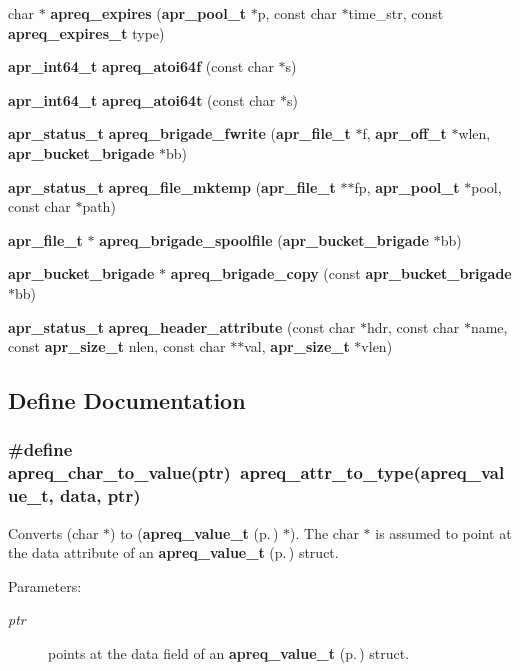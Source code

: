 \begin{CompactItemize}
\item 
char $\ast$ {\bf apreq\_\-expires} ({\bf apr\_\-pool\_\-t} $\ast$p, const char $\ast$time\_\-str, const {\bf apreq\_\-expires\_\-t} type)
\item 
{\bf apr\_\-int64\_\-t} {\bf apreq\_\-atoi64f} (const char $\ast$s)
\item 
{\bf apr\_\-int64\_\-t} {\bf apreq\_\-atoi64t} (const char $\ast$s)
\item 
{\bf apr\_\-status\_\-t} {\bf apreq\_\-brigade\_\-fwrite} ({\bf apr\_\-file\_\-t} $\ast$f, {\bf apr\_\-off\_\-t} $\ast$wlen, {\bf apr\_\-bucket\_\-brigade} $\ast$bb)
\item 
{\bf apr\_\-status\_\-t} {\bf apreq\_\-file\_\-mktemp} ({\bf apr\_\-file\_\-t} $\ast$$\ast$fp, {\bf apr\_\-pool\_\-t} $\ast$pool, const char $\ast$path)
\item 
{\bf apr\_\-file\_\-t} $\ast$ {\bf apreq\_\-brigade\_\-spoolfile} ({\bf apr\_\-bucket\_\-brigade} $\ast$bb)
\item 
{\bf apr\_\-bucket\_\-brigade} $\ast$ {\bf apreq\_\-brigade\_\-copy} (const {\bf apr\_\-bucket\_\-brigade} $\ast$bb)
\item 
{\bf apr\_\-status\_\-t} {\bf apreq\_\-header\_\-attribute} (const char $\ast$hdr, const char $\ast$name, const {\bf apr\_\-size\_\-t} nlen, const char $\ast$$\ast$val, {\bf apr\_\-size\_\-t} $\ast$vlen)
\end{CompactItemize}


\subsection{Define Documentation}
\subsubsection{\setlength{\rightskip}{0pt plus 5cm}\#define apreq\_\-char\_\-to\_\-value(ptr)\ apreq\_\-attr\_\-to\_\-type({\bf apreq\_\-value\_\-t}, data, ptr)}\label{group__Utils_a33}


Converts (char $\ast$) to ({\bf apreq\_\-value\_\-t} {\rm (p.\,\pageref{structapreq__value__t})} $\ast$). The char $\ast$ is assumed to point at the data attribute of an {\bf apreq\_\-value\_\-t} {\rm (p.\,\pageref{structapreq__value__t})} struct.\begin{Desc}
\item[Parameters: ]\par
\begin{description}
\item[{\em 
ptr}]points at the data field of an {\bf apreq\_\-value\_\-t} {\rm (p.\,\pageref{structapreq__value__t})} struct. \end{description}
\end{Desc}
